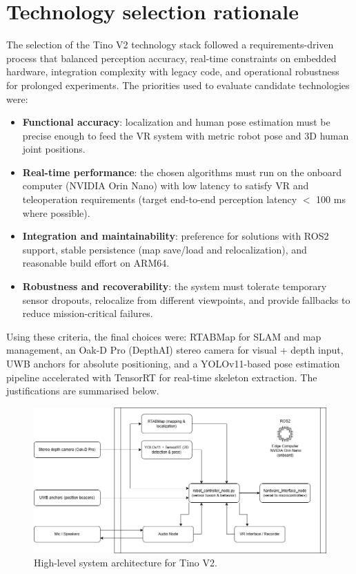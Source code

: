 \section{Technology selection rationale}

The selection of the Tino V2 technology stack followed a requirements-driven process that balanced perception accuracy, real-time constraints on embedded hardware, integration complexity with legacy code, and operational robustness for prolonged experiments. The priorities used to evaluate candidate technologies were:

\begin{itemize}
	\item \textbf{Functional accuracy}: localization and human pose estimation must be precise enough to feed the VR system with metric robot pose and 3D human joint positions.
	\item \textbf{Real-time performance}: the chosen algorithms must run on the onboard computer (NVIDIA Orin Nano) with low latency to satisfy VR and teleoperation requirements (target end-to-end perception latency $<$ 100 ms where possible).
	\item \textbf{Integration and maintainability}: preference for solutions with ROS2 support, stable persistence (map save/load and relocalization), and reasonable build effort on ARM64.
	\item \textbf{Robustness and recoverability}: the system must tolerate temporary sensor dropouts, relocalize from different viewpoints, and provide fallbacks to reduce mission-critical failures.
\end{itemize}

Using these criteria, the final choices were: RTABMap for SLAM and map management, an Oak-D Pro (DepthAI) stereo camera for visual + depth input, UWB anchors for absolute positioning, and a YOLOv11-based pose estimation pipeline accelerated with TensorRT for real-time skeleton extraction. The justifications are summarised below.

\begin{figure}[H]
	\centering
	\includegraphics[width=0.85\linewidth]{Images/system_architecture.png}
	\caption{High-level system architecture for Tino V2.}\label{fig-system-architecture}
\end{figure}

